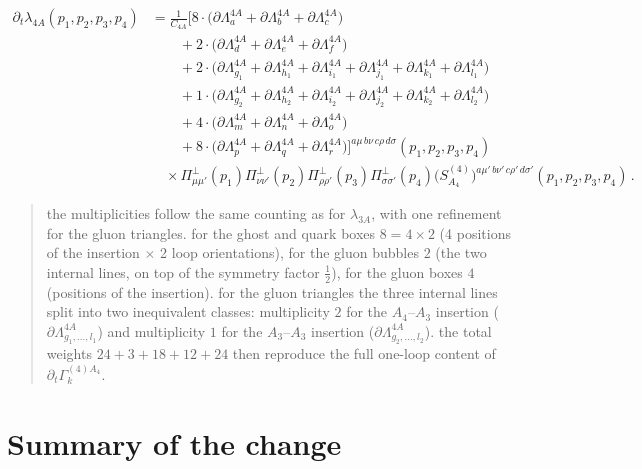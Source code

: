 \documentclass[11pt,a4paper]{article}
\begin{document}
\begin{align}
\partial_t\lambda_{4A}(p_1,p_2,p_3,p_4)
&=
\frac{1}{C_{4A}}
\Bigg[
8\cdot\bigl(\partial\Lambda^{4A}_{a}+\partial\Lambda^{4A}_{b}+\partial\Lambda^{4A}_{c}\bigr)
\nonumber\\
&\qquad
+2\cdot\bigl(\partial\Lambda^{4A}_{d}+\partial\Lambda^{4A}_{e}+\partial\Lambda^{4A}_{f}\bigr)
\nonumber\\
&\qquad
+2\cdot\bigl(\partial\Lambda^{4A}_{g_1}+\partial\Lambda^{4A}_{h_1}+\partial\Lambda^{4A}_{i_1}
           +\partial\Lambda^{4A}_{j_1}+\partial\Lambda^{4A}_{k_1}+\partial\Lambda^{4A}_{l_1}\bigr)
\nonumber\\
&\qquad
+1\cdot\bigl(\partial\Lambda^{4A}_{g_2}+\partial\Lambda^{4A}_{h_2}+\partial\Lambda^{4A}_{i_2}
           +\partial\Lambda^{4A}_{j_2}+\partial\Lambda^{4A}_{k_2}+\partial\Lambda^{4A}_{l_2}\bigr)
\nonumber\\
&\qquad
+4\cdot\bigl(\partial\Lambda^{4A}_{m}+\partial\Lambda^{4A}_{n}+\partial\Lambda^{4A}_{o}\bigr)
\nonumber\\
&\qquad
+8\cdot\bigl(\partial\Lambda^{4A}_{p}+\partial\Lambda^{4A}_{q}+\partial\Lambda^{4A}_{r}\bigr)
\Bigg]^{a\mu\,b\nu\,c\rho\,d\sigma}(p_1,p_2,p_3,p_4)
\nonumber\\
&\quad\times
\Pi^\perp_{\mu\mu'}(p_1)\Pi^\perp_{\nu\nu'}(p_2)\Pi^\perp_{\rho\rho'}(p_3)\Pi^\perp_{\sigma\sigma'}(p_4)
\bigl(S^{(4)}_{A_4}\bigr)^{a\mu'\,b\nu'\,c\rho'\,d\sigma'}(p_1,p_2,p_3,p_4)\,.
\label{eq:flow-lambda4A}
\end{align}

\begin{quote}
\small
the multiplicities follow the same counting as for $\lambda_{3A}$, with one
refinement for the gluon triangles. for the ghost and quark boxes
$8=4\times 2$ (4 positions of the insertion $\times$ 2 loop orientations),
for the gluon bubbles $2$ (the two internal lines, on top of the symmetry
factor $\tfrac12$), for the gluon boxes $4$ (positions of the insertion). for
the gluon triangles the three internal lines split into two inequivalent
classes: multiplicity $2$ for the $A_4$--$A_3$ insertion
($\partial\Lambda^{4A}_{g_1,\ldots,l_1}$) and multiplicity $1$ for the
$A_3$--$A_3$ insertion ($\partial\Lambda^{4A}_{g_2,\ldots,l_2}$). the total
weights $24+3+18+12+24$ then reproduce the full one-loop content of
$\partial_t\Gamma^{(4)A_4}_{k}$.
\end{quote}

\section*{Summary of the change}
\end{document}

